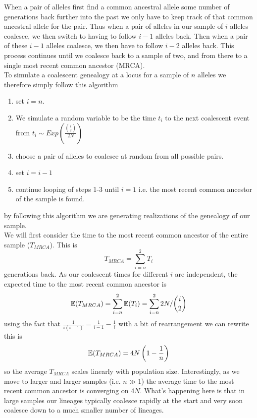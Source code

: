 When a pair of alleles first find a common ancestral allele some
number of generations back further into the past we only have to keep
track of that common ancestral allele for the pair. Thus when a pair
of alleles in our sample of $i$ alleles coalesce, we then switch to
having to follow $i-1$ alleles back. Then when a pair of these $i-1$
alleles coalesce, we then have to follow $i-2$ alleles back. This
process continues until we coalesce back to a sample of two, and from
there to a single most recent common ancestor (MRCA).\\


To simulate a coalescent genealogy at a locus for a sample of $n$ alleles we therefore simply follow this
algorithm
\begin{enumerate}
\item set $i=n$.
\item We simulate a random variable to be the time $t_i$ to the next coalescent event from $t_i \sim
 Exp\left(\frac{{i \choose
 2}}{2N} \right)$
\item choose a pair of alleles to coalesce at random from all possible
 pairs.
\item set $i=i-1$
\item continue looping of steps 1-3 until $i=1$ i.e. the most recent
 common ancestor of the sample is found.
\end{enumerate}
by following this algorithm we are generating realizations of the
genealogy of our sample. \\

We will first consider the time to the most recent common ancestor of
the entire sample ($T_{MRCA}$). This is
\begin{equation}
T_{MRCA} = \sum_{i=n}^2 T_i
\end{equation}
generations back. As our coalescent times for different $i$ are independent, the expected time to the most recent common ancestor
is
\begin{equation}
\mathbb{E}(T_{MRCA}) = \sum_{i=n}^2 \mathbb{E}(T_i) = \sum_{i=n}^2  2N/{i \choose
 2}
\end{equation}
using the fact that $\frac{1}{i(i-1)}=\frac{1}{i-1} - \frac{1}{i}$ with a bit of
rearrangement we can rewrite this is
\begin{equation}
\mathbb{E}(T_{MRCA}) = 4N\left(1- \frac{1}{n} \right)
\end{equation}
so the average $T_{MRCA}$ scales linearly with population
size. Interestingly, as we move to larger and larger samples (i.e. $n \gg 1$) the average
time to the most recent common ancestor is converging on $4N$. What's
happening here is that in large samples our lineages typically coalesce rapidly
at the start and very soon coalesce down to a much smaller number of
lineages.   \\

